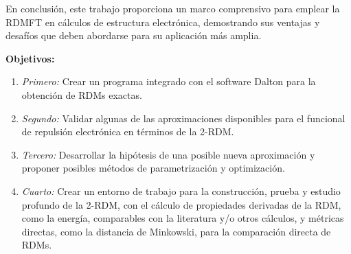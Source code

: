 En conclusión, este trabajo proporciona un marco comprensivo para emplear la 
RDMFT en cálculos de estructura electrónica, demostrando sus ventajas 
y desafíos que deben abordarse para su aplicación más amplia.

\vspace{0.3cm}
\textbf{Objetivos:}
\begin{enumerate}[label={}]
    \item \textit{Primero:} Crear un programa integrado con el software Dalton 
        para la obtención de RDMs exactas.
    \item \textit{Segundo:} Validar algunas de las aproximaciones disponibles
        para el funcional de repulsión electrónica en términos de la 2-RDM.
    \item \textit{Tercero:} Desarrollar la hipótesis de una posible nueva 
        aproximación y proponer posibles métodos de parametrización y optimización.
    \item \textit{Cuarto:} Crear un entorno de trabajo para la construcción, prueba y 
        estudio profundo de la 2-RDM, con el cálculo de propiedades derivadas 
        de la RDM, como la energía, comparables con la literatura y/o otros cálculos, 
        y métricas directas, como la distancia de Minkowski, para 
        la comparación directa de RDMs.
\end{enumerate}

